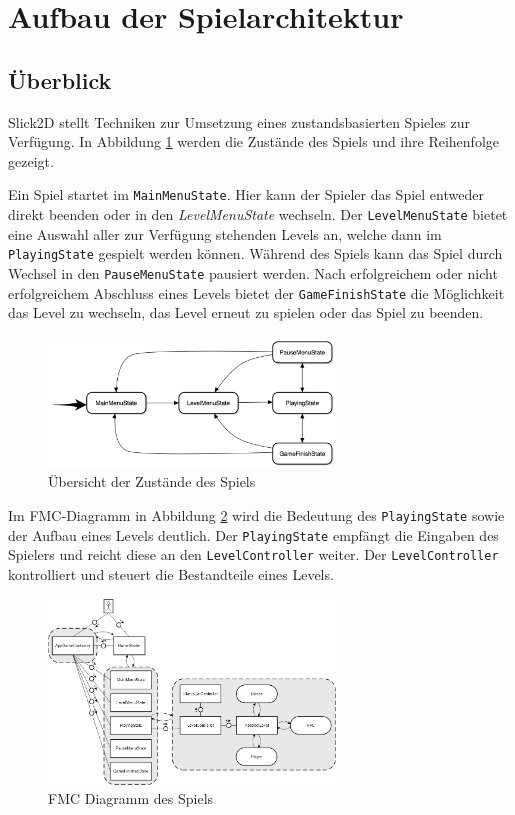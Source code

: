\section{Aufbau der Spielarchitektur}
\label{sec:architektur}

\subsection{Überblick}
\label{sub:architektur:ueberblick}

Slick2D stellt Techniken zur Umsetzung eines zustandsbasierten Spieles zur Verfügung.
In Abbildung \ref{fig:spielarchitektur:states} werden die Zustände des Spiels und ihre Reihenfolge gezeigt.

Ein Spiel startet im \texttt{MainMenuState}.
Hier kann der Spieler das Spiel entweder direkt beenden oder in den \textit{LevelMenuState} wechseln.
Der \texttt{LevelMenuState} bietet eine Auswahl aller zur Verfügung stehenden Levels an, welche dann im \texttt{PlayingState} gespielt werden können.
Während des Spiels kann das Spiel durch Wechsel in den \texttt{PauseMenuState} pausiert werden.
Nach erfolgreichem oder nicht erfolgreichem Abschluss eines Levels bietet der \texttt{GameFinishState} die Möglichkeit das Level zu wechseln, das Level erneut zu spielen oder das Spiel zu beenden.

\begin{figure}[]
\centering
\includegraphics[width=3in]{img/05_states.png}
\caption{Übersicht der Zustände des Spiels}
\label{fig:spielarchitektur:states}
\end{figure}

Im FMC-Diagramm in Abbildung \ref{fig:spielarchitektur:fmc} wird die Bedeutung des \texttt{PlayingState} sowie der Aufbau eines Levels deutlich.
Der \texttt{PlayingState} empfängt die Eingaben des Spielers und reicht diese an den \texttt{LevelController} weiter.
Der \texttt{LevelController} kontrolliert und steuert die Bestandteile eines Levels.

\begin{figure}[]
\centering
\includegraphics[width=3in]{img/05_fmc.png}
\caption{FMC Diagramm des Spiels}
\label{fig:spielarchitektur:fmc}
\end{figure}

